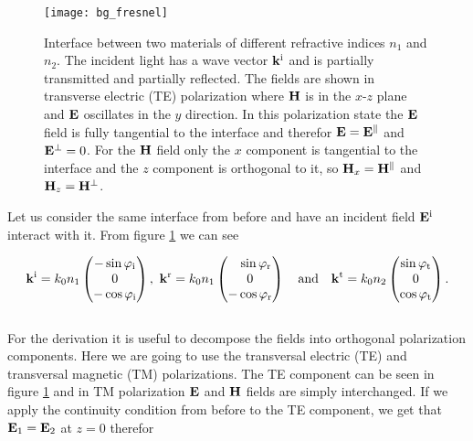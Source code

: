 \begin{figure}[H]
    \centering
    \texttt{[image: bg\_fresnel]}
    \caption{Interface between two materials of different refractive indices $n_1$ and $n_2$. The incident light has a wave vector $\vb k^{\mathrm{i}}$ and is partially transmitted and partially reflected. The fields are shown in transverse electric (TE) polarization where $\vb H$ is in the $x$-$z$ plane and $\vb E$ oscillates in the $y$ direction.
    In this polarization state the $\vb E$ field is fully tangential to the interface and therefor 
    $\vb E = \vb E^\parallel$ and $\vb E^\bot = 0$.
    For the $\vb H$ field only the $x$ component is tangential to the interface and the $z$ component is orthogonal to it, so 
    $\vb H_x = \vb H^\parallel$ and $\vb H_z = \vb H^\bot$.}
    \label{fig:bg:fresnel}
\end{figure}

Let us consider the same interface from before and have an incident field
$\vb E^{\mathrm{i}}$ interact with it. From figure \ref{fig:bg:fresnel} we can see

\begin{equation} \label{eq:bg:k}
    \vb k^\s{i} = k_0 n_1
    \begin{pmatrix}
        -\sin \varphi_\s{i}\\ 0\\ -\cos \varphi_\s{i}
    \end{pmatrix}
    , \
    \vb k^\s{r} = k_0 n_1
    \begin{pmatrix}
        \phantom{-} \sin \varphi_\s{r} \\ 0\\ -\cos \varphi_\s{r}
    \end{pmatrix}
    \qq{and}
    \vb k^\s{t} = k_0 n_2
    \begin{pmatrix}
        \sin \varphi_\s{t}\\ 0\\ \cos \varphi_\s{t}
    \end{pmatrix}.
\end{equation} 
\\

For the derivation it is useful to decompose the fields into orthogonal polarization components. Here we are going to use the transversal electric (TE) and transversal magnetic (TM) polarizations. The TE component can be seen in figure \ref{fig:bg:fresnel} and in TM polarization $\vb E$ and $\vb H$ fields are simply interchanged.
If we apply the continuity condition from before to the TE component, we get that $\vb E_1 = \vb E_2$ at $z = 0$ therefor

